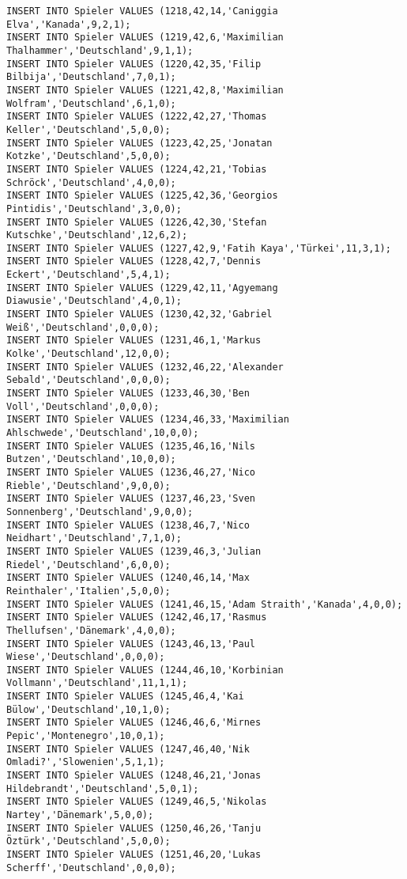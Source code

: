 \documentclass{bschlangaul-aufgabe}
\begin{document}
\begin{verbatim}
INSERT INTO Spieler VALUES (1218,42,14,'Caniggia Elva','Kanada',9,2,1);
INSERT INTO Spieler VALUES (1219,42,6,'Maximilian Thalhammer','Deutschland',9,1,1);
INSERT INTO Spieler VALUES (1220,42,35,'Filip Bilbija','Deutschland',7,0,1);
INSERT INTO Spieler VALUES (1221,42,8,'Maximilian Wolfram','Deutschland',6,1,0);
INSERT INTO Spieler VALUES (1222,42,27,'Thomas Keller','Deutschland',5,0,0);
INSERT INTO Spieler VALUES (1223,42,25,'Jonatan Kotzke','Deutschland',5,0,0);
INSERT INTO Spieler VALUES (1224,42,21,'Tobias Schröck','Deutschland',4,0,0);
INSERT INTO Spieler VALUES (1225,42,36,'Georgios Pintidis','Deutschland',3,0,0);
INSERT INTO Spieler VALUES (1226,42,30,'Stefan Kutschke','Deutschland',12,6,2);
INSERT INTO Spieler VALUES (1227,42,9,'Fatih Kaya','Türkei',11,3,1);
INSERT INTO Spieler VALUES (1228,42,7,'Dennis Eckert','Deutschland',5,4,1);
INSERT INTO Spieler VALUES (1229,42,11,'Agyemang Diawusie','Deutschland',4,0,1);
INSERT INTO Spieler VALUES (1230,42,32,'Gabriel Weiß','Deutschland',0,0,0);
INSERT INTO Spieler VALUES (1231,46,1,'Markus Kolke','Deutschland',12,0,0);
INSERT INTO Spieler VALUES (1232,46,22,'Alexander Sebald','Deutschland',0,0,0);
INSERT INTO Spieler VALUES (1233,46,30,'Ben Voll','Deutschland',0,0,0);
INSERT INTO Spieler VALUES (1234,46,33,'Maximilian Ahlschwede','Deutschland',10,0,0);
INSERT INTO Spieler VALUES (1235,46,16,'Nils Butzen','Deutschland',10,0,0);
INSERT INTO Spieler VALUES (1236,46,27,'Nico Rieble','Deutschland',9,0,0);
INSERT INTO Spieler VALUES (1237,46,23,'Sven Sonnenberg','Deutschland',9,0,0);
INSERT INTO Spieler VALUES (1238,46,7,'Nico Neidhart','Deutschland',7,1,0);
INSERT INTO Spieler VALUES (1239,46,3,'Julian Riedel','Deutschland',6,0,0);
INSERT INTO Spieler VALUES (1240,46,14,'Max Reinthaler','Italien',5,0,0);
INSERT INTO Spieler VALUES (1241,46,15,'Adam Straith','Kanada',4,0,0);
INSERT INTO Spieler VALUES (1242,46,17,'Rasmus Thellufsen','Dänemark',4,0,0);
INSERT INTO Spieler VALUES (1243,46,13,'Paul Wiese','Deutschland',0,0,0);
INSERT INTO Spieler VALUES (1244,46,10,'Korbinian Vollmann','Deutschland',11,1,1);
INSERT INTO Spieler VALUES (1245,46,4,'Kai Bülow','Deutschland',10,1,0);
INSERT INTO Spieler VALUES (1246,46,6,'Mirnes Pepic','Montenegro',10,0,1);
INSERT INTO Spieler VALUES (1247,46,40,'Nik Omladi?','Slowenien',5,1,1);
INSERT INTO Spieler VALUES (1248,46,21,'Jonas Hildebrandt','Deutschland',5,0,1);
INSERT INTO Spieler VALUES (1249,46,5,'Nikolas Nartey','Dänemark',5,0,0);
INSERT INTO Spieler VALUES (1250,46,26,'Tanju Öztürk','Deutschland',5,0,0);
INSERT INTO Spieler VALUES (1251,46,20,'Lukas Scherff','Deutschland',0,0,0);

\end{verbatim}
\end{document}
